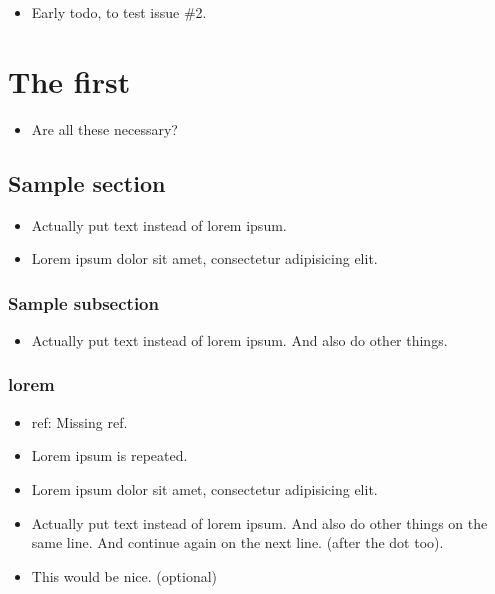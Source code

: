     \begin{itemize}[noitemsep]
        \item {\color{red}Early todo, to test issue \#2.}
    \end{itemize}
\chapter{The first}
\label{autosec:0}
    \begin{itemize}[noitemsep]
        \item {\color{ForestGreen}Are all these necessary?}
    \end{itemize}
\section{Sample section}
\label{autosec:1}
    \begin{itemize}[noitemsep]
        \item {\color{red}Actually put text instead of lorem ipsum.}
        \item Lorem ipsum dolor sit amet, consectetur adipisicing elit.
    \end{itemize}
\subsection{Sample subsection}
\label{autosec:2}
    \begin{itemize}[noitemsep]
        \item {\color{red}Actually put text instead of lorem ipsum.}
{\color{red}And also do other things.}
    \end{itemize}
\subsection{lorem}
\label{autosec:3}
    \begin{itemize}[noitemsep]
        \item {\color{Periwinkle}ref: Missing ref.}
        \item {\color{DarkOrchid}Lorem ipsum is repeated.}
        \item Lorem ipsum dolor sit amet, consectetur adipisicing elit.
        \item {\color{red}Actually put text instead of lorem ipsum. And also do other things on the same line.}
{\color{red}And continue again on the next line. (after the dot too).}
        \item {\color{Orange}This would be nice. (optional)}
    \end{itemize}
